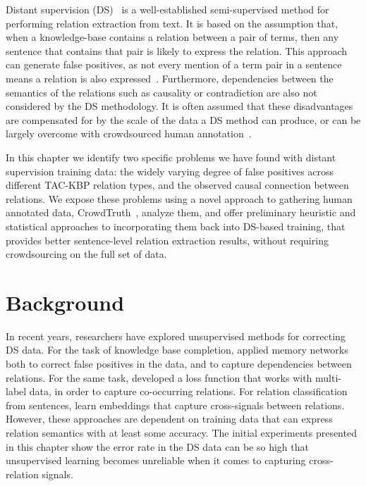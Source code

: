 Distant supervision (DS)~\cite{mintz2009distant,Welty:2010:LSR} is a well-established semi-supervised method for performing relation extraction from text. It is based on the assumption that, when a knowledge-base contains a relation between a pair of terms, then any sentence that contains that pair is likely to express the relation. This approach can generate false positives, as not every mention of a term pair in a sentence means a relation is also expressed~\cite{DBLP:conf/ijcai/FengGQLL17}. Furthermore, dependencies between the semantics of the relations such as causality or contradiction are also not considered by the DS methodology. It is often assumed that these disadvantages are compensated for by the scale of the data a DS method can produce, or can be largely overcome with crowdsourced human annotation~\cite{angeli2014combining}.  

In this chapter we identify two specific problems we have found with distant supervision training data: the widely varying degree of false positives across different TAC-KBP relation types, and the observed causal connection between relations. We expose these problems using a novel approach to gathering human annotated data, CrowdTruth~\cite{aroyo2014threesides,aroyo2015truth,aroyo2013crowd}, analyze them, and offer preliminary heuristic and statistical approaches to incorporating them back into DS-based training, that provides better sentence-level relation extraction results, without requiring crowdsourcing on the full set of data.

\section{Background}

In recent years, researchers have explored unsupervised methods for correcting DS data. For the task of knowledge base completion, \cite{DBLP:conf/ijcai/FengGQLL17} applied memory networks both to correct false positives in the data, and to capture dependencies between relations. For the same task, \cite{Jiang2016RelationEW} developed a loss function that works with multi-label data, in order to capture co-occurring relations. For relation classification from sentences, \cite{DBLP:conf/acl/SantosXZ15} learn embeddings that capture cross-signals between relations. However, these approaches are dependent on training data that can express relation semantics with at least some accuracy. The initial experiments presented in this chapter show the error rate in the DS data can be so high that unsupervised learning becomes unreliable when it comes to capturing cross-relation signals.


